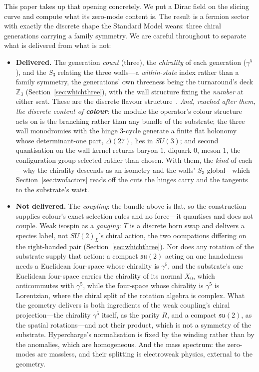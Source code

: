 \documentclass[11pt]{article}
\newcommand{\su}{\mathfrak{su}}
\begin{document}
This paper takes up that opening concretely. We put a Dirac field on the slicing curve and compute what its zero-mode content is. The result is a fermion sector with exactly the discrete shape the Standard Model wears: three chiral generations carrying a family symmetry. We are careful throughout to separate what is delivered from what is not:
\begin{itemize}
\item \textbf{Delivered.} The generation \emph{count} (three), the \emph{chirality} of each generation ($\gamma^5$), and the $S_3$ relating the three walls---a \emph{within-state} index rather than a family symmetry, the generations' own threeness being the turnaround's deck $\mathbb{Z}_3$ (Section~\ref{sec:whichthree}), with the wall structure fixing the \emph{number} at either seat. These are the discrete flavour structure~\cite{IshimoriEtAl2010}. \emph{And, reached after them, the discrete content of \textbf{colour}}: the module the operator's colour structure acts on is the branching rather than any bundle of the substrate; the three wall monodromies with the hinge $3$-cycle generate a finite flat holonomy whose determinant-one part, $\Delta(27)$, lies in $SU(3)$; and second quantisation on the wall kernel returns baryon $1$, diquark $0$, meson $1$, the configuration group selected rather than chosen. With them, the \emph{kind} of each---why the chirality descends as an isometry and the walls' $S_3$ global---which Section~\ref{sec:twofactors} reads off the cuts the hinges carry and the tangents to the substrate's waist.
\item \textbf{Not delivered.} The \emph{coupling}: the bundle above is flat, so the construction supplies colour's exact selection rules and no force---it quantises and does not couple. Weak isospin as a \emph{gauging}: $T$ is a discrete horn swap and delivers a species label, not $SU(2)_L$'s chiral action, the two occupations differing on the right-handed pair (Section~\ref{sec:whichthree}). Nor does any rotation of the substrate supply that action: a compact $\su(2)$ acting on one handedness needs a Euclidean four-space whose chirality is $\gamma^{5}$, and the substrate's one Euclidean four-space carries the chirality of its normal $X_0$, which anticommutes with $\gamma^{5}$, while the four-space whose chirality is $\gamma^{5}$ is Lorentzian, where the chiral split of the rotation algebra is complex. What the geometry delivers is both ingredients of the weak coupling's chiral projection---the chirality $\gamma^{5}$ itself, as the parity $R$, and a compact $\su(2)$, as the spatial rotations---and not their product, which is not a symmetry of the substrate. Hypercharge's normalisation is fixed by the winding rather than by the anomalies, which are homogeneous. And the mass spectrum: the zero-modes are massless, and their splitting is electroweak physics, external to the geometry.
\end{itemize}
\end{document}
